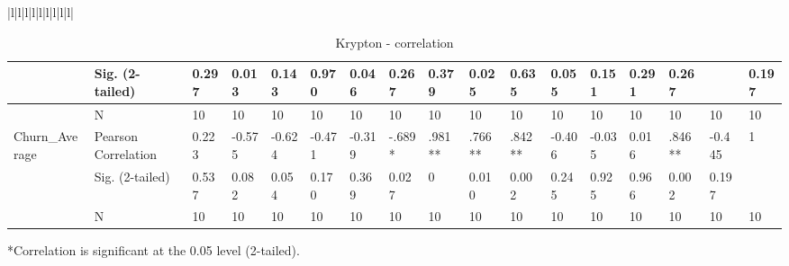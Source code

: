 \documentclass[UKenglish]{ifimaster}  %
\begin{document}
\begin{table}[!htbp]
\begin{adjustwidth}{-2.5cm}{}
{\begin{tabular}{|l|l|l|l|l|l|l|l|l|}
\begin{tabular}{ | l | l | l | l | l | l | l | l | l | l | l | l | l | l | l | l | l | }
	 & Sig. (2-tailed) & 0.297 & 0.013 & 0.143 & 0.970 & 0.046 & 0.267 & 0.379 & 0.025 & 0.635 & 0.055 & 0.151 & 0.291 & 0.267 &  & 0.197\\ \hline
	 & N & 10 & 10 & 10 & 10 & 10 & 10 & 10 & 10 & 10 & 10 & 10 & 10 & 10 & 10 & 10 \\ \hline
	Churn\_Average & Pearson Correlation & 0.223 & -0.575 & -0.624 & -0.471 & -0.319 & -.689* & .981** & .766** & .842** & -0.406 & -0.035 & 0.016 & .846** & -0.445 & 1 \\ \hline
	 & Sig. (2-tailed) & 0.537 & 0.082 & 0.054 & 0.170 & 0.369 & 0.027 & 0 & 0.010 & 0.002 & 0.245 & 0.925 & 0.966 & 0.002 & 0.197 &  \\ \hline
	 & N & 10 & 10 & 10 & 10 & 10 & 10 & 10 & 10 & 10 & 10 & 10 & 10 & 10 & 10 & 10 \\ \hline
\end{tabular}
      \end{tabular}%
    }
    \centerline{*Correlation is significant at the 0.05 level (2-tailed).}
  \caption{Krypton - correlation}%
  \label{swag}
    \end{adjustwidth}
\end{table}%
\end{document}
